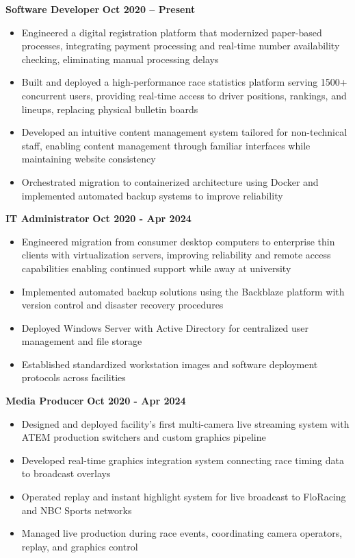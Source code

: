 \documentclass{article}
\begin{document}
\textbf{Software Developer} \hfill \textbf{Oct 2020 – Present}
\begin{itemize}[noitemsep,topsep=2pt]
	\item Engineered a digital registration platform that modernized paper-based processes, integrating payment processing and real-time number availability checking, eliminating manual processing delays
	\item Built and deployed a high-performance race statistics platform serving 1500+ concurrent users, providing real-time access to driver positions, rankings, and lineups, replacing physical bulletin boards
	\item Developed an intuitive content management system tailored for non-technical staff, enabling content management through familiar interfaces while maintaining website consistency
	\item Orchestrated migration to containerized architecture using Docker and implemented automated backup systems to improve reliability
\end{itemize}

\textbf{IT Administrator} \hfill \textbf{Oct 2020 - Apr 2024}
\begin{itemize}[noitemsep,topsep=2pt]
	\item Engineered migration from consumer desktop computers to enterprise thin clients with virtualization servers, improving reliability and remote access capabilities enabling continued support while away at university
	\item Implemented automated backup solutions using the Backblaze platform with version control and disaster recovery procedures
	\item Deployed Windows Server with Active Directory for centralized user management and file storage
	\item Established standardized workstation images and software deployment protocols across facilities
\end{itemize}

\textbf{Media Producer} \hfill \textbf{Oct 2020 - Apr 2024}
\begin{itemize}[noitemsep,topsep=2pt]
	\item Designed and deployed facility's first multi-camera live streaming system with ATEM production switchers and custom graphics pipeline
	\item Developed real-time graphics integration system connecting race timing data to broadcast overlays
	\item Operated replay and instant highlight system for live broadcast to FloRacing and NBC Sports networks
	\item Managed live production during race events, coordinating camera operators, replay, and graphics control
\end{itemize}
\end{document}

